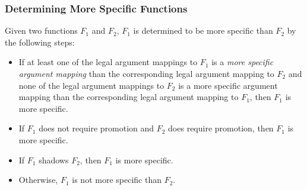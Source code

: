 \subsubsection{Determining More Specific Functions}
\label{Determining_More_Specific_Functions}

Given two functions $F_1$ and $F_2$, $F_1$ is determined to be more
specific than $F_2$ by the following steps:
\begin{itemize}
\item
If at least one of the legal argument mappings to $F_1$ is a {\em more
specific argument mapping} than the corresponding legal argument
mapping to $F_2$ and none of the legal argument mappings to $F_2$ is a
more specific argument mapping than the corresponding legal argument
mapping to $F_1$, then $F_1$ is more specific.
\item If $F_1$ does not require promotion and $F_2$ does require promotion, then $F_1$ is more specific.
\item If $F_1$ shadows $F_2$, then $F_1$ is more specific.
\item Otherwise, $F_1$ is not more specific than $F_2$.
\end{itemize}

